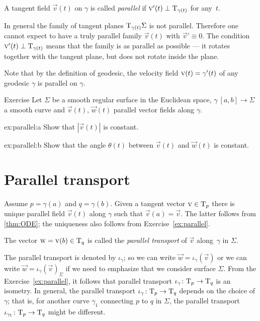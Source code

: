 A tangent field ${\vec v}(t)$ on $\gamma$ is called \emph{parallel} if ${\textsc v}'(t)\perp\mathrm{T}_{\gamma(t)}$ for any~$t$.

In general the family of tangent planes $\mathrm{T}_{\gamma(t)}\Sigma$ is not parallel.
Therefore one cannot expect to have a truly parallel family ${\vec v}(t)$ with ${\vec v}'\equiv 0$.
The condition ${\textsc v}'(t)\perp\mathrm{T}_{\gamma(t)}$ means that the family is as parallel as possible --- it rotates together with the tangent plane, but does not rotate inside the plane.

Note that by the definition of geodesic, the velocity field ${\vec v}(t)\z=\gamma'(t)$ of any geodesic $\gamma$ is parallel on $\gamma$.

\begin{thm}{Exercise}\label{ex:parallel}
Let $\Sigma$ be a smooth regular surface in the Euclidean space, 
$\gamma\:[a,b]\to \Sigma$ a smooth curve 
and ${\vec v}(t)$, ${\vec w}(t)$ parallel vector fields along $\gamma$.

\begin{subthm}{ex:parallel:a} Show that $|{\vec v}(t)|$ is constant.
\end{subthm}

\begin{subthm}{ex:parallel:b} Show that the angle $\theta(t)$ between ${\vec v}(t)$ and ${\vec w}(t)$ is constant.
\end{subthm}

\end{thm}

\section*{Parallel transport}

Assume $p=\gamma(a)$ and $q=\gamma(b)$.
Given a tangent vector ${\textsc v}\in\mathrm{T}_p$ there is unique parallel field ${\vec v}(t)$ along $\gamma$ such that ${\vec v}(a)={\vec v}$.
The latter follows from \ref{thm:ODE}; the uniqueness also follows from Exercise~\ref{ex:parallel}.

The vector $\textsc w={\textsc v}(b)\in\mathrm{T}_q$ is called the \emph{parallel transport} of ${\vec v}$ along~$\gamma$ in $\Sigma$.

The parallel transport is denoted by $\iota_\gamma$;
so we can write $\vec w=\iota_\gamma({\vec v})$ or we can write $\vec w=\iota_\gamma({\vec v})_\Sigma$ if we need to emphasize that we consider surface $\Sigma$.
From the Exercise~\ref{ex:parallel}, it follows that parallel transport $\iota_\gamma\:\T_p\z\to\T_q$ is an isometry.
In general, the parallel transport $\iota_\gamma\:\T_p\z\to\T_q$ depends on the choice of $\gamma$; that is, for another curve $\gamma_1$ connecting $p$ to $q$ in $\Sigma$, the parallel transport $\iota_{\gamma_1}\colon\mathrm{T}_p\to\mathrm{T}_q$ might be different.

